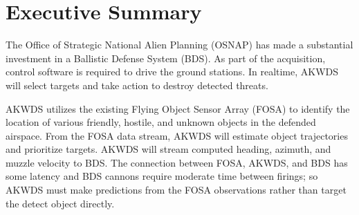 \chapter*{Executive Summary}
The Office of Strategic National Alien Planning (OSNAP) has made a substantial investment in a Ballistic Defense System (BDS). As part of the acquisition, control software is required to drive the ground stations. In realtime, AKWDS will select targets and take action to destroy detected threats.

AKWDS utilizes the existing Flying Object Sensor Array (FOSA) to identify the location of various friendly, hostile, and unknown objects in the defended airspace. From the FOSA data stream, AKWDS will estimate object trajectories and prioritize targets. AKWDS will stream computed heading, azimuth, and muzzle velocity to BDS. The connection between FOSA, AKWDS, and BDS has some latency and BDS cannons require moderate time between firings; so AKWDS must make predictions from the FOSA observations rather than target the detect object directly.